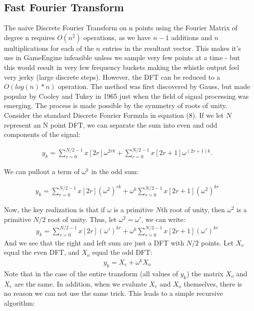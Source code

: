 \documentclass[DIV=calc, paper=a4, fontsize=11pt, twocolumn]{scrartcl}   %
\begin{document}
\subsection{Fast Fourier Transform}

The naive Discrete Fourier Transform on n points using the Fourier Matrix of degree n requires $O(n^2)$ operations, as we have $n-1$ additions and $n$ multiplications for each of the $n$ entries in the resultant vector. This makes it's use in GameEngine infeasible unless we sample very few points at a time - but this would result in very few frequency buckets making the whistle output feel very jerky (large discrete steps). However, the DFT can be reduced to a $O(log(n)*n)$ operation. The method was first discovered by Gauss, but made popular by Cooley and Tukey in 1965 just when the field of signal processing was emerging. The process is made possible by the symmetry of roots of unity. Consider the standard Discrete Fourier Formula in equation (8). If we let $N$ represent an N point DFT, we can separate the sum into even and odd components of the signal:

\begin{align}
y_k = \sum_{r=0}^{N/2-1}x[2r]\omega^{2rk} + \sum_{r=0}^{N/2-1}x[2r+1]\omega^{(2r+1)k}  .
\end{align}

We can pullout a term of $\omega^k$ in the odd sum:

\begin{align}
y_k = \sum_{r=0}^{N/2-1}x[2r](\omega^{2})^{rk} + \omega^k \sum_{r=0}^{N/2-1}x[2r+1](\omega^{2})^{kr}
\end{align}

Now, the key realization is that if $\omega$ is a primitive $N$th root of unity, then $\omega^2$ is a primitive $N/2$ root of unity. Thus, let $\omega^2 = \omega'$, we can write:
\begin{align}
y_k = \sum_{r=0}^{N/2-1}x[2r](\omega')^{kr} + \omega^k \sum_{r=0}^{N/2-1}x[2r+1](\omega')^{kr}
\end{align}
And we see that the right and left sum are just a DFT with $N/2$ points. Let $X_e$ equal the even DFT, and $X_o$ equal the odd DFT:
\begin{align}
y_k = X_e + \omega^k X_o
\end{align}
Note that in the case of the entire transform (all values of $y_k$) the matrix $X_o$ and $X_e$ are the same. In addition, when we evaluate $X_e$ and $X_o$ themselves, there is no reason we can not use the same trick. This leads to a simple recursive algorithm:
\end{document}
